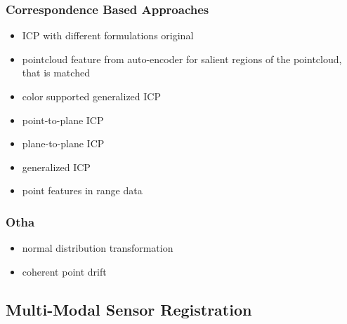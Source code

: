 \subsubsection{Correspondence Based Approaches}

\begin{itemize}
    \item ICP with different formulations original\cite{besl_pami1992}
    \item pointcloud feature from auto-encoder for salient regions of the pointcloud, that is matched\cite{elbaz_cvpr2017}
    \item color supported generalized ICP\cite{korn_2014}
    \item point-to-plane ICP
    \item plane-to-plane ICP
    \item generalized ICP\cite{segal_2009}
    \item point features in range data\cite{steder_robot2010}
\end{itemize}

\subsubsection{Otha}
\begin{itemize}
    \item normal distribution transformation\cite{biber_iros2003}
    \item coherent point drift\cite{myronenko_ieee2010}
\end{itemize}

\subsection{Multi-Modal Sensor Registration}

